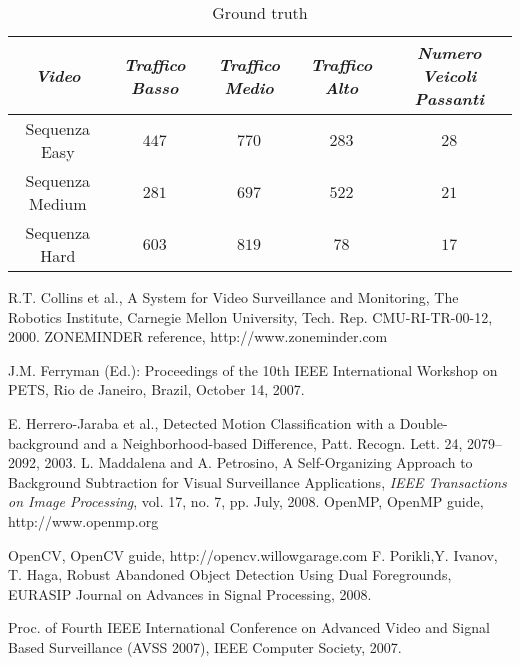 \documentclass[10pt]{llncs}
\begin{document}
\begin{table}
\caption{Ground truth} 
\label{tab:testAVSS} \centering
\begin{tabular}{ccccc}
\hline %
\emph{Video} &  \emph{Traffico Basso}  &  \emph{Traffico Medio} &  \emph{Traffico Alto} &  \emph{ Numero Veicoli Passanti} \\
\hline %
Sequenza Easy   & $447$ & $770$ & $283$ & $28$   \\
Sequenza Medium & $281$ & $697$ & $522$ & $21$ \\
Sequenza Hard   & $603$ & $819$ & $78$  & $17$   \\

\hline
\end{tabular}
\end{table}





\newpage




%
  

\begin{thebibliography}{99}

R.T. Collins et al., A System for Video Surveillance and
Monitoring, The Robotics Institute, Carnegie Mellon University,
Tech. Rep. CMU-RI-TR-00-12, 2000.
%
ZONEMINDER reference, http://www.zoneminder.com

%
J.M. Ferryman (Ed.): Proceedings of the 10th IEEE International
Workshop on PETS, Rio de Janeiro, Brazil, October 14, 2007.

E. Herrero-Jaraba et al., Detected Motion Classification with a
Double-background and a Neighborhood-based Difference,
Patt. Recogn. Lett. 24, 2079--2092, 2003.
%
L. Maddalena and A. Petrosino, A Self-Organizing Approach to
Background Subtraction for Visual Surveillance Applications, {\sl
IEEE Transactions on Image Processing}, vol. 17, no. 7, pp. July,
2008.
%
OpenMP, OpenMP guide, http://www.openmp.org

OpenCV, OpenCV guide, http://opencv.willowgarage.com
%
F. Porikli,Y. Ivanov, T. Haga,
Robust Abandoned Object Detection Using Dual Foregrounds,
EURASIP Journal on Advances in Signal Processing, 2008.

Proc. of Fourth IEEE International Conference on Advanced Video
and Signal Based Surveillance (AVSS 2007), IEEE Computer Society,
2007.

\end{thebibliography}
\end{document}
